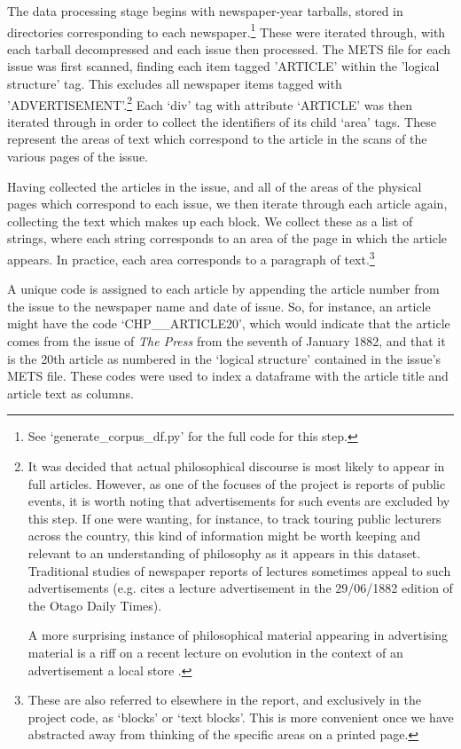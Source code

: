 \documentclass{article}
\begin{document}
The data processing stage begins with newspaper-year tarballs, stored in directories corresponding to each newspaper.\footnote{See `generate\_\-corpus\_\-df.py' for the full code for this step.} These were iterated through, with each tarball decompressed and each issue then processed. The METS file for each issue was first scanned, finding each item tagged 'ARTICLE' within the 'logical structure' tag. This excludes all newspaper items tagged with 'ADVERTISEMENT'.\footnote{It was decided that actual philosophical discourse is most likely to appear in full articles. However, as one of the focuses of the project is reports of public events, it is worth noting that advertisements for such events are excluded by this step. If one were wanting, for instance, to track touring public lecturers across the country, this kind of information might be worth keeping and relevant to an understanding of philosophy as it appears in this dataset. Traditional studies of newspaper reports of lectures sometimes appeal to such advertisements (e.g. \cite[fn. 13]{crane-2013} cites a lecture advertisement in the 29/06/1882 edition of the Otago Daily Times).

A more surprising instance of philosophical material appearing in advertising material is a riff on a recent lecture on evolution in the context of an advertisement a local store \cite[39--40]{crane-2013}.
}
Each `div' tag with attribute `ARTICLE' was then iterated through in order to collect the identifiers of its child `area' tags. These represent the areas of text which correspond to the article in the scans of the various pages of the issue. %

Having collected the articles in the issue, and all of the areas of the physical pages which correspond to each issue, we then iterate through each article again, collecting the text which makes up each block. We collect these as a list of strings, where each string corresponds to an area of the page in which the article appears. In practice, each area corresponds to a paragraph of text.\footnote{These are also referred to elsewhere in the report, and exclusively in the project code, as `blocks' or `text blocks'. This is more convenient once we have abstracted away from thinking of the specific areas on a printed page.}

A unique code is assigned to each article by appending the article number from the issue to the newspaper name and date of issue. So, for instance, an article might have the code `CHP\_\_\-ARTICLE20', which would indicate that the article comes from the issue of \textit{The Press} from the seventh of  January 1882, and that it is the 20th article as numbered in the `logical structure' contained in the issue's METS file. These codes were used to index a dataframe with the article title and article text as columns.
\end{document}
